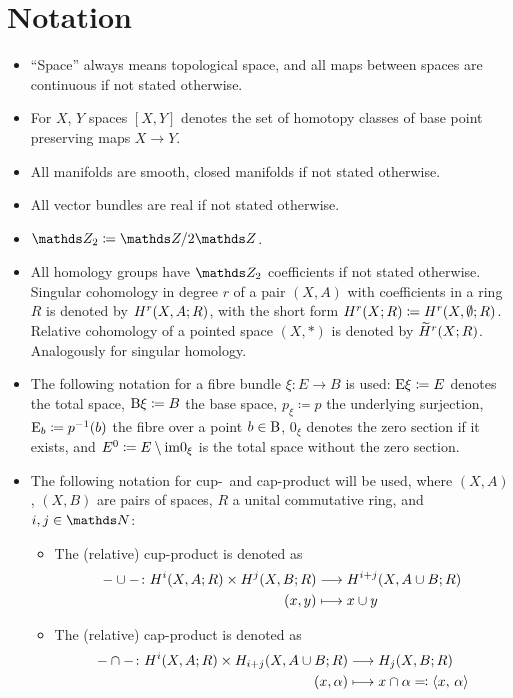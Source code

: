 \section*{Notation}
\begin{itemize}
\item \enquote{Space} always means topological space, and all maps
  between spaces are continuous if not stated otherwise.
\item For $X$, $Y$ spaces $[X,Y]$ denotes the set of homotopy classes
  of base point preserving maps $X\to Y$.
\item All manifolds are smooth, closed manifolds if not stated otherwise.
\item All vector bundles are real if not stated otherwise.
\item $\Zmod2 \coloneqq \Z/2\Z$.
\item All homology groups have $\Zmod2$ coefficients if not stated
  otherwise. Singular cohomology in degree $r$ of a pair $(X,A)$ with
  coefficients in a ring $R$ is denoted by $H^r(X,A;R)$, with the
  short form $H^r(X;R)\coloneqq H^r(X,\emptyset;R)$. Relative cohomology
  of a pointed space $(X,\ast)$ is denoted by $\widetilde{H}^r(X;R)$.
  Analogously for singular homology.
\item The following notation for a fibre bundle $\xi\colon E\to B$ is used:
  $\mathrm{E}\xi\coloneqq E$ denotes the total space,
  $\mathrm{B}\xi\coloneqq B$ the base space,
  $p_\xi\coloneqq p$ the underlying surjection,
  $\mathrm{E}_b\coloneqq p^{-1}(b)$ the fibre over a point $b\in \B$,
  $0_\xi$ denotes the zero section if it exists, and
  ${E}^0\coloneqq E\setminus\mathrm{im}0_{\xi}$
  is the total space without the zero section.
\item The following notation for cup-~and cap-product will be used,
  where $(X,A)$, $(X,B)$ are pairs of spaces, $R$ a unital commutative
  ring, and $i,j\in\Nat$:
  \begin{itemize}
  \item The (relative) cup-product is denoted as
    \begin{align*}
      -\cup-\colon
      H^i(X,A;R)\times H^j(X,B;R) &\longrightarrow H^{i+j}(X,A\cup B;R)\\
      (x, y) &\longmapsto x\cup y
    \end{align*}
  \item The (relative) cap-product is denoted as
    \begin{align*}
      -\cap-\colon
      H^i(X,A;R)\times H_{i+j}(X,A\cup B;R) &\longrightarrow H_j(X,B;R)\\
      (x, \alpha) &\longmapsto x\cap \alpha \eqqcolon \left\langle x,\, \alpha \right\rangle
    \end{align*}
  \end{itemize}
\end{itemize}



